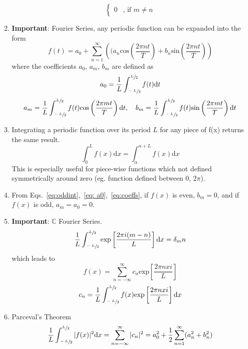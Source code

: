 \documentclass{article}
\begin{document}
\begin{enumerate}
\begin{equation}
\begin{cases}
			0 & \text{, if } m\neq n
		\end{cases}
\end{equation}
\item \textbf{Important}: Fourier Series, any periodic function can be expanded into the form
\begin{equation}
f(t) = a_0 + \sum_{n=1}^{\infty}\left((a_n\mathrm{cos}\left(\frac{2 \pi n t}{T}\right)+b_n\mathrm{sin}\left(\frac{2 \pi n t}{T}\right)\right)
\label{eq:FourierSeries}
\end{equation}
where the coefficients $a_0$, $a_m$, $b_m$ are defined as
\begin{equation}
a_0 = \frac{1}{L}\int_{\sfrac{-L}{2}}^{\sfrac{L}{2}}f(t)\mathrm{d}t
\label{eq: a0}
\end{equation}
\begin{equation}
a_m = \frac{1}{L}\int_{\sfrac{-L}{2}}^{\sfrac{L}{2}}f(t)\mathrm{cos}\left(\frac{2 \pi m t}{T}\right)\mathrm{d}t,~~~b_m = \frac{1}{L}\int_{\sfrac{-L}{2}}^{\sfrac{L}{2}}f(t)\mathrm{sin}\left(\frac{2 \pi m t}{T}\right)\mathrm{d}t
\label{eq:coeffs}
\end{equation}
\item Integrating a periodic function over its period $L$ for any piece of f(x) returns the same result.
\begin{equation}
\int_0^Lf(x)\mathrm{d}x=\int_{\alpha}^{\alpha+L}f(x)\mathrm{d}x
\end{equation}
This is especially useful for piece-wise functions which not defined symmetrically around zero (eg. function defined between 0, 2$\pi$).
\item From Eqs.~\ref{eq:oddint},~\ref{eq: a0},~\ref{eq:coeffs}, if $f(x)$ is even, $b_m = 0$, and if $f(x)$ is odd, $a_m = a_0 = 0$.
\newpage
\item \textbf{Important}: $\mathbb{C}$ Fourier Series.
\begin{equation}
\frac{1}{L}\int_{\sfrac{-L}{2}}^{\sfrac{L}{2}}\mathrm{exp}\left[\frac{2\pi i (m-n)}{L}\right]\mathrm{d}x=\delta_mn
\end{equation}
which leads to
\begin{equation}
f(x) = \sum_{n=-\infty}^{\infty}c_n\mathrm{exp}\left[\frac{2\pi nxi}{L}\right]
\end{equation}
\begin{equation}
c_n = \frac{1}{L}\int_{\sfrac{-L}{2}}^{\sfrac{L}{2}}f(x)\mathrm{exp}\left[\frac{2\pi nxi}{L}\right]\mathrm{d}x
\end{equation}
\item Parceval's Theorem
\begin{equation}
\frac{1}{L}\int_{\sfrac{-L}{2}}^{\sfrac{L}{2}}|f(x)|^2\mathrm{d}x = \sum_{n=-\infty}^{\infty}|c_n|^2 = a_0^2 + \frac{1}{2}\sum_{n=1}^{\infty}(a_n^2+b_n^2)
\end{equation}
\end{enumerate}
\end{document}
